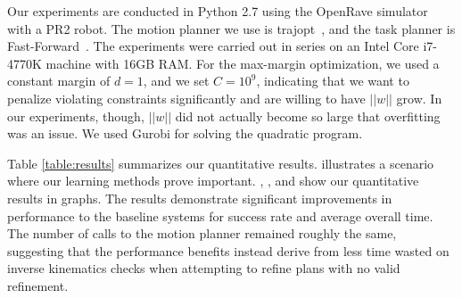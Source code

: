 Our experiments are conducted in Python 2.7 using the OpenRave simulator~\cite{Diankov_2008_6117} with a PR2 robot.
The motion planner we use is trajopt~\cite{schulman2013finding}, and the task planner is Fast-Forward~\cite{FF}.
The experiments were carried out in series on an Intel Core i7-4770K machine with 16GB RAM. For the max-margin optimization,
we used a constant margin of $d = 1$, and we set $C = 10^{9}$, indicating that we want to penalize violating
constraints significantly and are willing to have $||w||$ grow. In our experiments, though, $||w||$ did not actually become
so large that overfitting was an issue. We used Gurobi for solving the quadratic program.

Table \ref{table:results} summarizes our quantitative results.  illustrates a scenario where
our learning methods prove important. , , and  show our quantitative
results in graphs. The results demonstrate significant improvements in performance to the baseline systems for success rate and
average overall time. The number of calls to the motion planner remained roughly the same,
suggesting that the performance benefits instead derive from less time wasted on inverse kinematics checks when
attempting to refine plans with no valid refinement.
